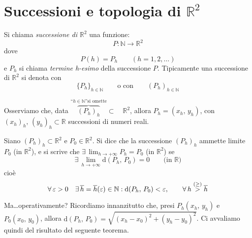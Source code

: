 \section{Successioni e topologia di $\mathbb{R}^2$}
\begin{definition}
Si chiama \emph{successione di $\mathbb{R}^2$} una funzione:
$$P:\mathbb{N} \longrightarrow \mathbb{R}^2$$
dove
$$P(h)=P_h \qquad (h=1,2,\ldots )$$
e $P_h$ si chiama \emph{termine h-esimo} della successione $P$.
Tipicamente una successione di $\mathbb{R}^2$ si denota con
$$\lbrace P_h \rbrace_{h \in \mathbb{N}} \qquad \text{o con} \qquad (P_h)_{h \in \mathbb{N}}$$
\end{definition}

Osserviamo che, data $\overbrace{(P_h)_h}^{\text{``}h \in \mathbb{N}\text{''} \text{si omette}} \subset \quad \mathbb{R}^2$, allora $P_h = (x_h,\, y_h)$, con $(x_h)_h,\, (y_h)_h \subset \mathbb{R}$ successioni di numeri reali.

\begin{definition}
Siano $(P_h)_h \subset \mathbb{R}^2$ e $P_0 \in \mathbb{R}^2$. Si dice che la successione $(P_h)_h$ ammette limite $P_0$ (in $\mathbb{R}^2$), e si scrive che $\exists \, \displaystyle \lim_{h \rightarrow +\infty} P_h = P_0$  (in $\mathbb{R}^2$) se
$$\exists \, \lim_{h \rightarrow +\infty} \mathrm{d}(P_h,\, P_0)=0 \qquad \text{(in }\mathbb{R}\text{)}$$
cioè
$$\forall \, \varepsilon > 0 \quad \exists \, \overline{h} = \overline{h}(\varepsilon) \in \mathbb{N} : \mathrm{d}(P_h,\, P_0) < \varepsilon, \qquad \forall \, h \overset{\tiny (\geq)}{>} \overline{h}$$
\end{definition}

Ma\dots operativamente? Ricordiamo innanzitutto che, presi $P_h(x_h,\, y_h)$ e $P_0(x_0,\, y_0)$, allora $\mathrm{d}(P_h,\, P_0) = \sqrt{(x_h-x_0)^2+(y_h-y_0)^2}$. Ci avvaliamo quindi del risultato del seguente teorema.

